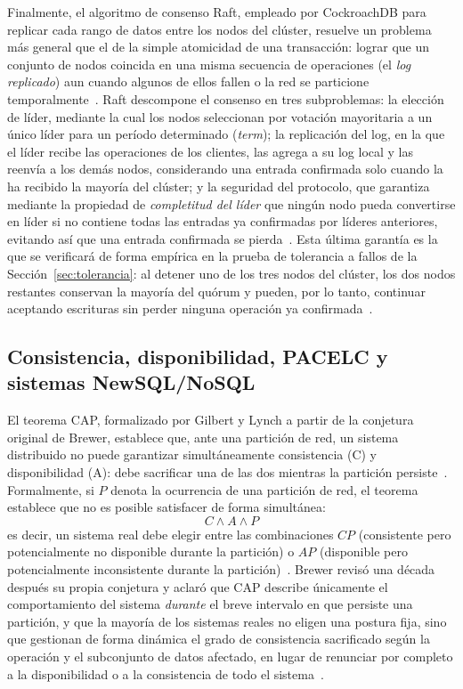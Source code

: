 \documentclass[11pt,a4paper]{article}
\begin{document}
Finalmente, el algoritmo de consenso Raft, empleado por CockroachDB para
replicar cada rango de datos entre los nodos del cl\'uster, resuelve un
problema m\'as general que el de la simple atomicidad de una transacci\'on:
lograr que un conjunto de nodos coincida en una misma secuencia de
operaciones (el \emph{log replicado}) aun cuando algunos de ellos fallen o
la red se particione temporalmente~\cite{ongaro2014,taft2020}. Raft descompone el
consenso en tres subproblemas: la elecci\'on de l\'ider, mediante la cual
los nodos seleccionan por votaci\'on mayoritaria a un \'unico l\'ider para
un per\'iodo determinado (\emph{term}); la replicaci\'on del log, en la que
el l\'ider recibe las operaciones de los clientes, las agrega a su log local
y las reenv\'ia a los dem\'as nodos, considerando una entrada confirmada
solo cuando la ha recibido la mayor\'ia del cl\'uster; y la seguridad del
protocolo, que garantiza mediante la propiedad de \emph{completitud del
l\'ider} que ning\'un nodo pueda convertirse en l\'ider si no contiene todas
las entradas ya confirmadas por l\'ideres anteriores, evitando as\'i que una
entrada confirmada se pierda~\cite{ongaro2014,taft2020}. Esta \'ultima garant\'ia es
la que se verificar\'a de forma emp\'irica en la prueba de tolerancia a
fallos de la Secci\'on~\ref{sec:tolerancia}: al detener uno de los tres nodos del cl\'uster,
los dos nodos restantes conservan la mayor\'ia del qu\'orum y pueden, por lo
tanto, continuar aceptando escrituras sin perder ninguna operaci\'on ya
confirmada~\cite{ongaro2014,taft2020}.

\subsection{Consistencia, disponibilidad, PACELC y sistemas NewSQL/NoSQL}

El teorema CAP, formalizado por Gilbert y Lynch a partir de la conjetura
original de Brewer, establece que, ante una partici\'on de red, un sistema
distribuido no puede garantizar simult\'aneamente consistencia (C) y
disponibilidad (A): debe sacrificar una de las dos mientras la partici\'on
persiste~\cite{gilbertlynch2002,brewer2012}. Formalmente, si $P$ denota la ocurrencia de
una partici\'on de red, el teorema establece que no es posible satisfacer de
forma simult\'anea:
\begin{equation}
C \wedge A \wedge P
\end{equation}
es decir, un sistema real debe elegir entre las combinaciones $CP$ (consistente
pero potencialmente no disponible durante la partici\'on) o $AP$ (disponible
pero potencialmente inconsistente durante la partici\'on)~\cite{gilbertlynch2002,brewer2012}.
Brewer revis\'o una d\'ecada despu\'es su propia conjetura y aclar\'o que CAP
describe \'unicamente el comportamiento del sistema \emph{durante} el breve
intervalo en que persiste una partici\'on, y que la mayor\'ia de los sistemas
reales no eligen una postura fija, sino que gestionan de forma din\'amica el
grado de consistencia sacrificado seg\'un la operaci\'on y el subconjunto de
datos afectado, en lugar de renunciar por completo a la disponibilidad o a la
consistencia de todo el sistema~\cite{brewer2012,gilbertlynch2002}.
\end{document}
